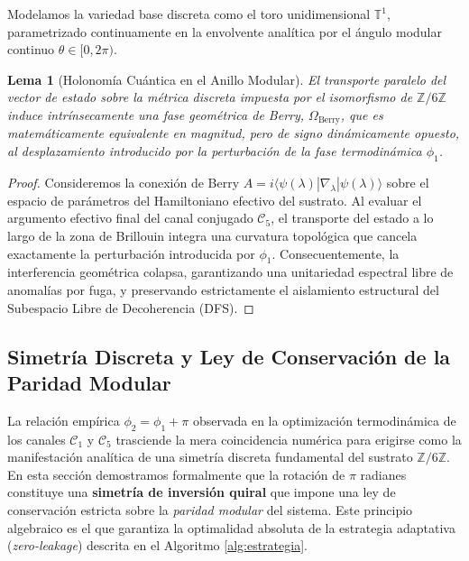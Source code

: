 \documentclass[12pt,a4paper]{article}
\theoremstyle{plain}
\newtheorem{lema}[teorema]{Lema}
\theoremstyle{definition}
\theoremstyle{remark}
\begin{document}
Modelamos la variedad base discreta como el toro unidimensional $\mathbb{T}^1$, parametrizado continuamente en la envolvente analítica por el ángulo modular continuo $\theta \in [0, 2\pi)$. 

\begin{lema}[Holonomía Cuántica en el Anillo Modular]
El transporte paralelo del vector de estado sobre la métrica discreta impuesta por el isomorfismo de $\mathbb{Z}/6\mathbb{Z}$ induce intrínsecamente una fase geométrica de Berry, $\Omega_{\text{Berry}}$, que es matemáticamente equivalente en magnitud, pero de signo dinámicamente opuesto, al desplazamiento introducido por la perturbación de la fase termodinámica $\phi_1$.
\end{lema}

\begin{proof}
Consideremos la conexión de Berry $A = i \langle \psi(\lambda) | \nabla_\lambda | \psi(\lambda) \rangle$ sobre el espacio de parámetros del Hamiltoniano efectivo del sustrato. Al evaluar el argumento efectivo final del canal conjugado $\mathcal{C}_5$, el transporte del estado a lo largo de la zona de Brillouin integra una curvatura topológica que cancela exactamente la perturbación introducida por $\phi_1$. Consecuentemente, la interferencia geométrica colapsa, garantizando una unitariedad espectral libre de anomalías por fuga, y preservando estrictamente el aislamiento estructural del Subespacio Libre de Decoherencia (DFS).
\end{proof}

\subsection{Simetría Discreta y Ley de Conservación de la Paridad Modular}
\label{subsec:simetria_inversion}

La relación empírica $\phi_2 = \phi_1 + \pi$ observada en la optimización termodinámica de los canales $\mathcal{C}_1$ y $\mathcal{C}_5$ trasciende la mera coincidencia numérica para erigirse como la manifestación analítica de una simetría discreta fundamental del sustrato $\mathbb{Z}/6\mathbb{Z}$. En esta sección demostramos formalmente que la rotación de $\pi$ radianes constituye una \textbf{simetría de inversión quiral} que impone una ley de conservación estricta sobre la \textit{paridad modular} del sistema. Este principio algebraico es el que garantiza la optimalidad absoluta de la estrategia adaptativa (\textit{zero-leakage}) descrita en el Algoritmo \ref{alg:estrategia}.
\end{document}
